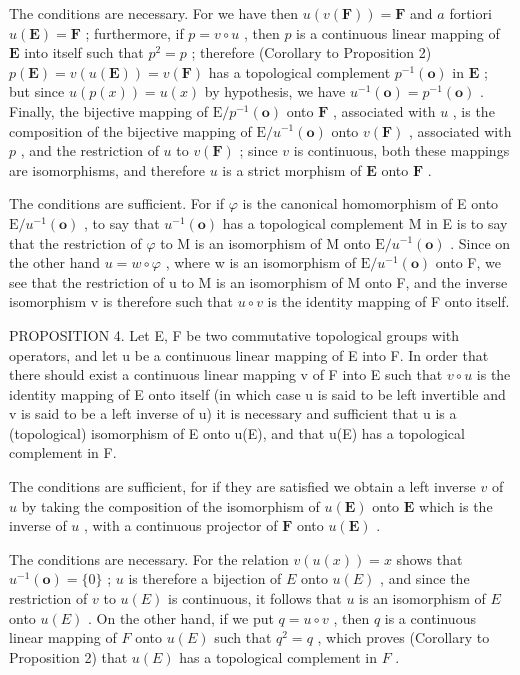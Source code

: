 The conditions are necessary. For we have then \(u(v(\mathbf{F})) = \mathbf{F}\) and \(a\) fortiori \(u(\mathbf{E}) = \mathbf{F}\) ; furthermore, if \(p = v \circ u\) , then \(p\) is a continuous linear mapping of \(\mathbf{E}\) into itself such that \(p^2 = p\) ; therefore (Corollary to Proposition 2) \(p(\mathbf{E}) = v(u(\mathbf{E})) = v(\mathbf{F})\) has a topological complement \(p^{-1}(\mathbf{o})\) in \(\mathbf{E}\) ; but since \(u(p(x)) = u(x)\) by hypothesis, we have \(u^{-1}(\mathbf{o}) = p^{-1}(\mathbf{o})\) . Finally, the bijective mapping of \(\mathrm{E}/p^{-1}(\mathbf{o})\) onto \(\mathbf{F}\) , associated with \(u\) , is the composition of the bijective mapping of \(\mathrm{E}/u^{-1}(\mathbf{o})\) onto \(v(\mathbf{F})\) , associated with \(p\) , and the restriction of \(u\) to \(v(\mathbf{F})\) ; since \(v\) is continuous, both these mappings are isomorphisms, and therefore \(u\) is a strict morphism of \(\mathbf{E}\) onto \(\mathbf{F}\) .

The conditions are sufficient. For if \(\varphi\) is the canonical homomorphism of E onto \(\mathrm{E}/u^{-1}(\mathbf{o})\) , to say that \(u^{-1}(\mathbf{o})\) has a topological complement M in E is to say that the restriction of \(\varphi\) to M is an isomorphism of M onto \(\mathrm{E}/u^{-1}(\mathbf{o})\) . Since on the other hand \(u=w\circ\varphi\) , where w is an isomorphism of \(\mathrm{E}/u^{-1}(\mathbf{o})\) onto F, we see that the restriction of u to M is an isomorphism of M onto F, and the inverse isomorphism v is therefore such that \(u\circ v\) is the identity mapping of F onto itself.

PROPOSITION 4. Let E, F be two commutative topological groups with operators, and let u be a continuous linear mapping of E into F. In order that there should exist a continuous linear mapping v of F into E such that \(v \circ u\) is the identity mapping of E onto itself (in which case u is said to be left invertible and v is said to be a left inverse of u) it is necessary and sufficient that u is a (topological) isomorphism of E onto u(E), and that u(E) has a topological complement in F.

The conditions are sufficient, for if they are satisfied we obtain a left inverse \(v\) of \(u\) by taking the composition of the isomorphism of \(u(\mathbf{E})\) onto \(\mathbf{E}\) which is the inverse of \(u\) , with a continuous projector of \(\mathbf{F}\) onto \(u(\mathbf{E})\) .

The conditions are necessary. For the relation \(v(u(x)) = x\) shows that \(u^{-1}(\mathbf{o}) = \{0\}\) ; \(u\) is therefore a bijection of \(E\) onto \(u(E)\) , and since the restriction of \(v\) to \(u(E)\) is continuous, it follows that \(u\) is an isomorphism of \(E\) onto \(u(E)\) . On the other hand, if we put \(q = u \circ v\) , then \(q\) is a continuous linear mapping of \(F\) onto \(u(E)\) such that \(q^2 = q\) , which proves (Corollary to Proposition 2) that \(u(E)\) has a topological complement in \(F\) .


